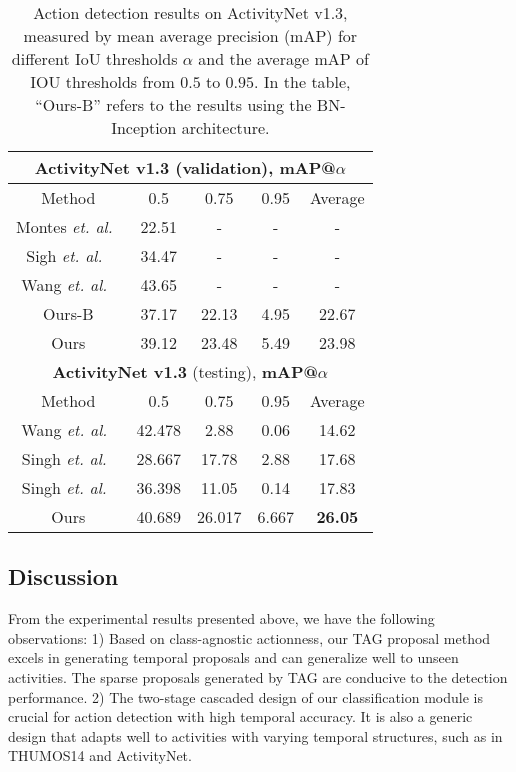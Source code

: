 \documentclass[10pt,twocolumn,letterpaper]{article}
\begin{document}
\begin{table}[t]
	\begin{center}
		\begin{tabular}{c|ccc|c}
			\hline
			\multicolumn{5}{c}{\textbf{ActivityNet v1.3} (validation), \textbf{mAP@$\alpha$}}   \\ \hline
			Method & 0.5 & 0.75 & 0.95 &Average\\ \hline
Montes \emph{et. al.}~\cite{Montes_2016_NIPSWS} & 22.51 & - & - &  -      \\ \hline
			Sigh \emph{et. al.}~\cite{DBLP:journals/corr/SinghC16} & 34.47 & - & - &    -         \\ \hline
			Wang \emph{et. al.}~\cite{UTS} & 43.65 &  -  & -  &  -      \\ \hline\hline
			Ours-B& 37.17 & 22.13 & 4.95 & 22.67       \\ \hline
			Ours & 39.12 & 23.48 & 5.49 & 23.98       \\ \hline\hline
			\multicolumn{5}{c}{\textbf{ActivityNet v1.3} (testing),  \textbf{mAP@$\alpha$}}   \\ \hline
			Method & 0.5 & 0.75 & 0.95 &Average\\ \hline
			Wang \emph{et. al.}~\cite{UTS}  & 42.478 & 2.88 & 0.06 & 14.62 \\ \hline
			Singh \emph{et. al.}~\cite{Singh_2016_CVPR} & 28.667 & 17.78 & 2.88 & 17.68 \\ \hline
			Singh \emph{et. al.}~\cite{DBLP:journals/corr/SinghC16}& 36.398 & 11.05 & 0.14 & 17.83 \\ \hline\hline
			Ours& 40.689 & 26.017 & 6.667 &   {\bf 26.05}     \\ \hline
		\end{tabular}
	\end{center}
	\caption{Action detection results on ActivityNet v1.3, measured by mean average precision (mAP) for different IoU thresholds $\alpha$ and the average mAP of IOU thresholds from $ 0.5 $ to $ 0.95 $. In the table, ``Ours-B'' refers to the results using the BN-Inception architecture.}
	\label{table:anet_v1.3}
\end{table}



\subsection{Discussion}
From the experimental results presented above,
we have the following observations:
1) Based on class-agnostic actionness, our TAG proposal method excels in generating temporal proposals and can generalize well to unseen activities.
The sparse proposals generated by TAG are conducive to the detection performance. 
2) The two-stage cascaded design of our classification module is crucial for action detection with high temporal accuracy. It is also a generic design that adapts well to activities with varying temporal structures, such as in THUMOS14 and ActivityNet.
\end{document}
